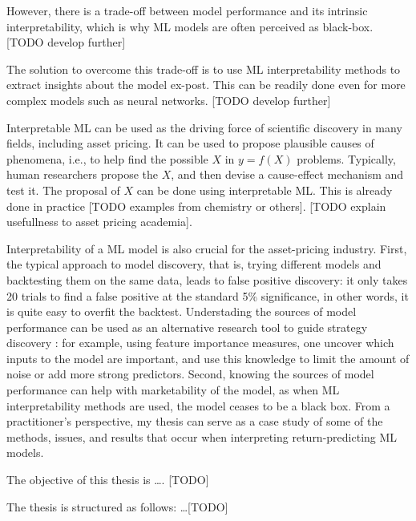 However, there is a trade-off between model performance and its intrinsic interpretability, which is why ML models are often perceived as black-box. [TODO develop further]

The solution to overcome this trade-off is to use ML interpretability methods to extract insights about the model ex-post. This can be readily done even for more complex models such as neural networks. [TODO develop further]

Interpretable ML can be used as the driving force of scientific discovery in many fields, including asset pricing. It can be used to propose plausible causes of phenomena, i.e., to help find the possible $X$ in $y=f(X)$ problems. Typically, human researchers propose the $X$, and then devise a cause-effect mechanism and test it. The proposal of $X$ can be done using interpretable ML. This is already done in practice [TODO examples from chemistry or others]. [TODO explain usefullness to asset pricing academia].
 
Interpretability of a ML model is also crucial for the asset-pricing industry. First, the typical approach to model discovery, that is, trying different models and backtesting them on the same data, leads to false positive discovery: it only takes 20 trials to find a false positive at the standard 5\% significance, in other words, it is quite easy to overfit the backtest. Understading the sources of model performance can be used as an alternative research tool to guide strategy discovery \citep{de2018advances}: for example, using feature importance measures, one uncover which inputs to the model are important, and use this knowledge to limit the amount of noise or add more strong predictors. Second, knowing the sources of model performance can help with marketability of the model, as when ML interpretability methods are used, the model ceases to be a black box. From a practitioner’s perspective, my thesis can serve as a case study of some of the methods, issues, and results that occur when interpreting return-predicting ML models.

The objective of this thesis is \ldots. [TODO]

The thesis is structured as follows: \ldots [TODO] 
